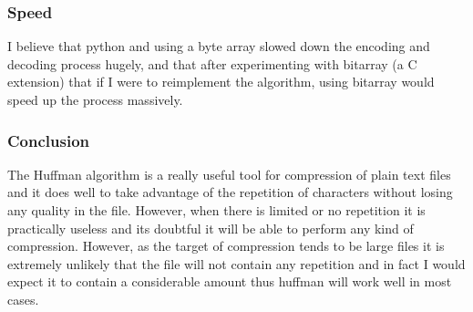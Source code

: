 \documentclass{mm2}
\begin{document}
\subsubsection{Speed}
I believe that python and using a byte array slowed down the encoding and decoding process hugely, and that after experimenting with bitarray (a C extension) that if I were to reimplement the algorithm, using bitarray would speed up the process massively.
\subsubsection{Conclusion}
The Huffman algorithm is a really useful tool for compression of plain text files and it does well to take advantage of the repetition of characters without losing any quality in the file. However, when there is limited or no repetition it is practically useless and its doubtful it will be able to perform any kind of compression. However, as the target of compression tends to be large files it is extremely unlikely that the file will not contain any repetition and in fact I would expect it to contain a considerable amount thus huffman will work well in most cases.
\end{document}
